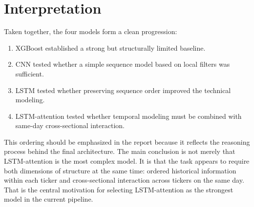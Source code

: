\section{Interpretation}

Taken together, the four models form a clean progression:

\begin{enumerate}[leftmargin=1.2em]
    \item XGBoost established a strong but structurally limited baseline.
    \item CNN tested whether a simple sequence model based on local filters was sufficient.
    \item LSTM tested whether preserving sequence order improved the technical modeling.
    \item LSTM-attention tested whether temporal modeling must be combined with same-day cross-sectional interaction.
\end{enumerate}

This ordering should be emphasized in the report because it reflects the reasoning process behind the final architecture. The main conclusion is not merely that LSTM-attention is the most complex model. It is that the task appears to require both dimensions of structure at the same time: ordered historical information within each ticker and cross-sectional interaction across tickers on the same day. That is the central motivation for selecting LSTM-attention as the strongest model in the current pipeline.
